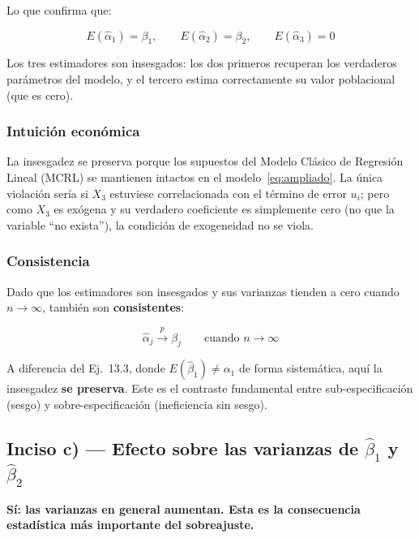 \documentclass[12pt, letterpaper]{article}
\begin{document}
Lo que confirma que:

\begin{equation}
  \boxed{
    E(\hat{\alpha}_1) = \beta_1, \qquad
    E(\hat{\alpha}_2) = \beta_2, \qquad
    E(\hat{\alpha}_3) = 0
  }
\end{equation}

Los tres estimadores son insesgados: los dos primeros recuperan los
verdaderos parámetros del modelo, y el tercero estima correctamente su
valor poblacional (que es cero).

\subsubsection{Intuición económica}

La insesgadez se preserva porque los supuestos del Modelo Clásico de
Regresión Lineal (MCRL) se mantienen intactos en el modelo~\eqref{eq:ampliado}.
La única violación sería si $X_3$ estuviese correlacionada con el término
de error $u_i$; pero como $X_3$ es exógena y su verdadero coeficiente es
simplemente cero (no que la variable ``no exista''), la condición de
exogeneidad no se viola.

\subsubsection{Consistencia}

Dado que los estimadores son insesgados y sus varianzas tienden a cero
cuando $n \to \infty$, también son \textbf{consistentes}:

\begin{equation}
  \hat{\alpha}_j \xrightarrow{p} \beta_j \qquad \text{cuando } n \to \infty
\end{equation}

\begin{clave}
  A diferencia del Ej.~13.3, donde $E(\hat{\beta}_1) \neq \alpha_1$ de
  forma sistemática, aquí la insesgadez \textbf{se preserva}. Este es el
  contraste fundamental entre sub-especificación (sesgo) y sobre-especificación
  (ineficiencia sin sesgo).
\end{clave}

\subsection{Inciso c) --- Efecto sobre las varianzas de $\hat{\beta}_1$ y $\hat{\beta}_2$}

\textbf{Sí: las varianzas en general aumentan. Esta es la consecuencia
estadística más importante del sobreajuste.}
\end{document}
